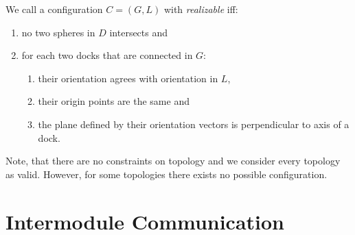 We call a configuration $C = (G, L)$ with \emph{realizable} iff:
\begin{enumerate}
    \item no two spheres in $D$ intersects and
    \item for each two docks that are connected in $G$:
        \begin{enumerate}
            \item their orientation agrees with orientation in $L$,
            \item their origin points are the same and
            \item the plane defined by their orientation vectors is
            perpendicular to axis of a dock.
        \end{enumerate}
\end{enumerate}
Note, that there are no constraints on topology and we consider every topology
as valid. However, for some topologies there exists no possible configuration.

\section{Intermodule Communication}\label{sec:communication}

